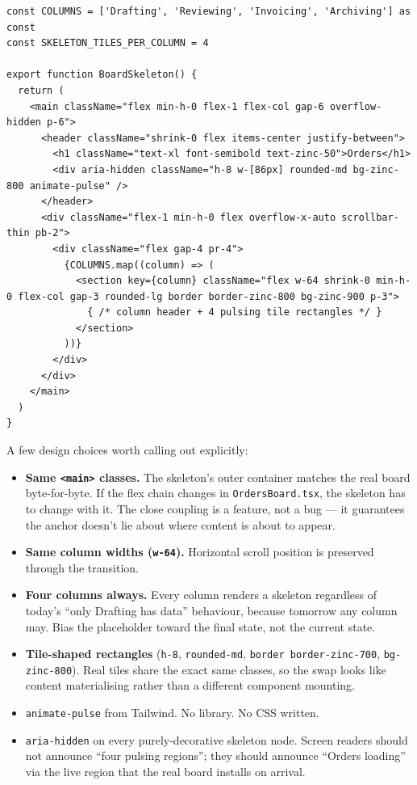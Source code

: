 \documentclass[11pt]{article}
\begin{document}
\begin{lstlisting}
const COLUMNS = ['Drafting', 'Reviewing', 'Invoicing', 'Archiving'] as const
const SKELETON_TILES_PER_COLUMN = 4

export function BoardSkeleton() {
  return (
    <main className="flex min-h-0 flex-1 flex-col gap-6 overflow-hidden p-6">
      <header className="shrink-0 flex items-center justify-between">
        <h1 className="text-xl font-semibold text-zinc-50">Orders</h1>
        <div aria-hidden className="h-8 w-[86px] rounded-md bg-zinc-800 animate-pulse" />
      </header>
      <div className="flex-1 min-h-0 flex overflow-x-auto scrollbar-thin pb-2">
        <div className="flex gap-4 pr-4">
          {COLUMNS.map((column) => (
            <section key={column} className="flex w-64 shrink-0 min-h-0 flex-col gap-3 rounded-lg border border-zinc-800 bg-zinc-900 p-3">
              { /* column header + 4 pulsing tile rectangles */ }
            </section>
          ))}
        </div>
      </div>
    </main>
  )
}
\end{lstlisting}

A few design choices worth calling out explicitly:

\begin{itemize}[leftmargin=1.4em, itemsep=0.15em]
  \item \textbf{Same \texttt{<main>} classes.} The skeleton's outer container matches the real board byte-for-byte. If the flex chain changes in \texttt{OrdersBoard.tsx}, the skeleton has to change with it. The close coupling is a feature, not a bug --- it guarantees the anchor doesn't lie about where content is about to appear.
  \item \textbf{Same column widths (\texttt{w-64}).} Horizontal scroll position is preserved through the transition.
  \item \textbf{Four columns always.} Every column renders a skeleton regardless of today's ``only Drafting has data'' behaviour, because tomorrow any column may. Bias the placeholder toward the final state, not the current state.
  \item \textbf{Tile-shaped rectangles} (\texttt{h-8}, \texttt{rounded-md}, \texttt{border border-zinc-700}, \texttt{bg-zinc-800}). Real tiles share the exact same classes, so the swap looks like content materialising rather than a different component mounting.
  \item \texttt{animate-pulse} from Tailwind. No library. No CSS written.
  \item \texttt{aria-hidden} on every purely-decorative skeleton node. Screen readers should not announce ``four pulsing regions''; they should announce ``Orders loading'' via the live region that the real board installs on arrival.
\end{itemize}
\end{document}
